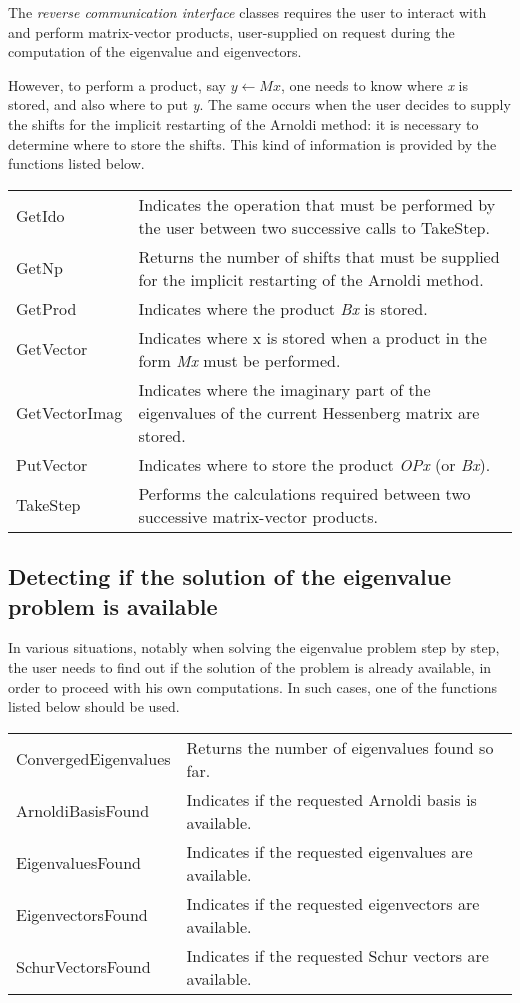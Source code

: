 The \textit{reverse communication interface} classes requires the user to interact with \ARPP{} and perform matrix-vector products, user-supplied on request during the computation of the eigenvalue and eigenvectors. 

However, to perform a product, say $y\leftarrow Mx$, one needs to know where \textit{x} is stored, and also where to put \textit{y}. The same occurs when the user decides to supply the shifts for the implicit restarting of the Arnoldi method: it is necessary to determine where to store the shifts. This kind of information is provided by the functions listed below. 

\begin{tabularx}{\textwidth}{LX}
	GetIdo & Indicates the operation that must be performed by the user between two successive calls to TakeStep.\\
	GetNp & Returns the number of shifts that must be supplied for the implicit restarting of the Arnoldi method.\\
	GetProd & Indicates where the product \textit{Bx} is stored.\\
	GetVector & Indicates where x is stored when a product in the form \textit{Mx} must be performed.\\
	GetVectorImag & Indicates where the imaginary part of the eigenvalues of the current Hessenberg matrix are stored.\\
	PutVector & Indicates where to store the product \textit{OPx} (or \textit{Bx}).\\
	TakeStep & Performs the calculations required between two successive matrix-vector products.\\
\end{tabularx}

\subsection{Detecting if the solution of the eigenvalue problem is available}

In various situations, notably when solving the eigenvalue problem step by step, the user needs to find out if the solution of the problem is already available, in order to proceed with his own computations. In such cases, one of the functions listed below should be used.

\begin{tabularx}{\textwidth}{LX}
	ConvergedEigenvalues & Returns the number of eigenvalues found so far.\\
	ArnoldiBasisFound & Indicates if the requested Arnoldi basis is available.\\
	EigenvaluesFound & Indicates if the requested eigenvalues are available.\\
	EigenvectorsFound & Indicates if the requested eigenvectors are available.\\
	SchurVectorsFound & Indicates if the requested Schur vectors are available.\\
\end{tabularx}

